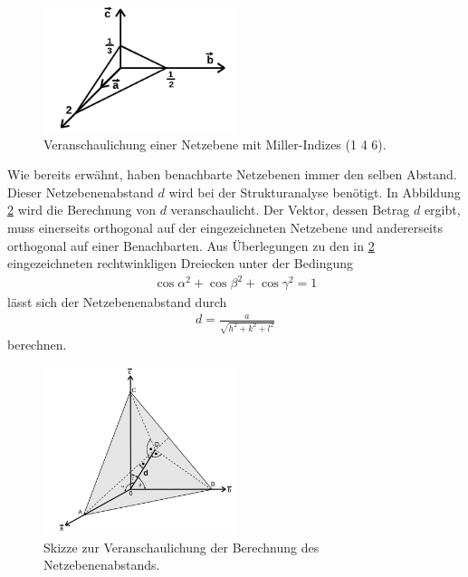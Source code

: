 \begin{figure}[hhh]
\centering
\includegraphics[width=0.5\textwidth]{abbildungen/miller_ind.png}
\caption{Veranschaulichung einer Netzebene mit Miller-Indizes (1 4 6).\cite{sample}}
\label{fig:miller_ind}
\end{figure}

Wie bereits erwähnt, haben benachbarte Netzebenen immer
den selben Abstand. Dieser Netzebenenabstand $d$ wird bei der
Strukturanalyse benötigt. In Abbildung \ref{fig:miller_abstand} wird
die Berechnung von $d$ veranschaulicht. Der Vektor, dessen Betrag $d$ ergibt,
muss einerseits orthogonal auf der eingezeichneten Netzebene und andererseits orthogonal
auf einer Benachbarten. Aus Überlegungen zu den in \ref{fig:miller_abstand}
eingezeichneten rechtwinkligen Dreiecken unter der Bedingung
\begin{align}
\label{eqn:4}
\cos\alpha^2 + \cos\beta^2 + \cos\gamma^2 = 1
\end{align}
lässt sich der Netzebenenabstand
durch
\begin{align}
\label{eqn:5}
d = \frac{a}{\sqrt{h^2 + k^2 + l^2}}
\end{align}
berechnen.

\begin{figure}[hhh]
\centering
\includegraphics[width=0.5\textwidth]{abbildungen/miller_dist.png}
\caption{Skizze zur Veranschaulichung der Berechnung des Netzebenenabstands.\cite{sample}}
\label{fig:miller_abstand}
\end{figure}

